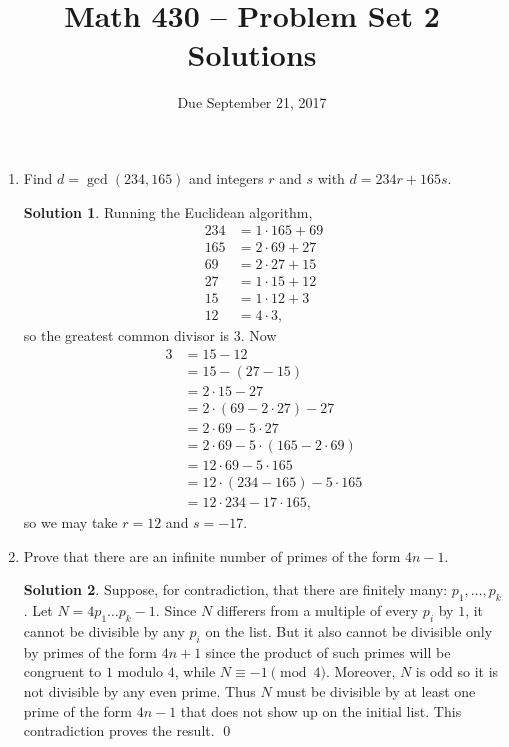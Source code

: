 \documentclass{article}
\title{Math 430 -- Problem Set 2 Solutions}
\date{Due September 21, 2017}
\theoremstyle{definition}
\newtheorem*{solution}{Solution}
\begin{document}
\maketitle


\begin{enumerate}

\item[2.15(b).] Find $d = \gcd(234, 165)$ and integers $r$ and $s$ with $d = 234r + 165s$.
\begin{solution}
Running the Euclidean algorithm,
\begin{align*}
234 &= 1 \cdot 165 + 69 \\
165 &= 2 \cdot 69 + 27 \\
69 &= 2 \cdot 27 + 15 \\
27 &= 1 \cdot 15 + 12 \\
15 &= 1 \cdot 12 + 3 \\
12 &= 4 \cdot 3,
\end{align*}
so the greatest common divisor is $3$.  Now
\begin{align*}
3 &= 15 - 12 \\
&= 15 - (27-15) \\
&= 2 \cdot 15 - 27 \\
&= 2 \cdot (69-2 \cdot 27) - 27 \\
&= 2 \cdot 69 - 5 \cdot 27 \\
&= 2 \cdot 69 - 5 \cdot (165 - 2 \cdot 69) \\
&= 12 \cdot 69 - 5 \cdot 165 \\
&= 12 \cdot (234 - 165) - 5 \cdot 165 \\
&= 12 \cdot 234 - 17 \cdot 165,
\end{align*}
so we may take $r = 12$ and $s = -17$.
\end{solution}
\item[2.30.] Prove that there are an infinite number of primes of the form $4n-1$.
\begin{solution}
Suppose, for contradiction, that there are finitely many: $p_1, \dots, p_k$.  Let $N = 4p_1\dots p_k - 1$.  Since $N$ differers from a multiple of every $p_i$ by $1$, it cannot be divisible by any $p_i$ on the list.  But it also cannot be divisible only by primes of the form $4n+1$ since the product of such primes will be congruent to $1$ modulo $4$, while $N \equiv -1 \pmod{4}$.  Moreover, $N$ is odd so it is not divisible by any even prime.  Thus $N$ must be divisible by at least one prime of the form $4n-1$ that does not show up on the initial list.  This contradiction proves the result. \qed

\end{solution}
\end{enumerate}
\end{document}
